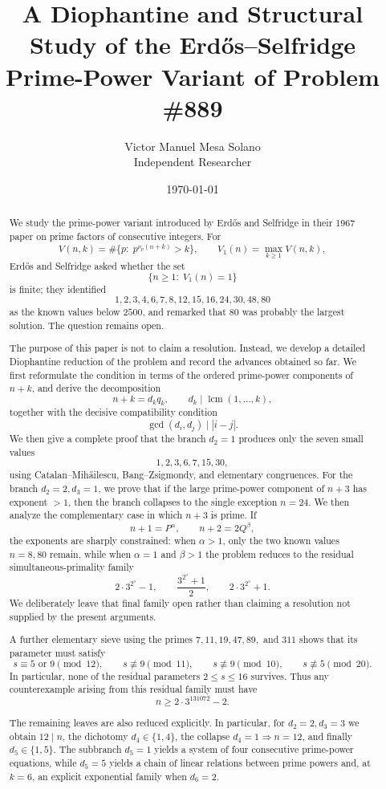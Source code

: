 \documentclass[11pt]{article}
\title{\textbf{A Diophantine and Structural Study of the Erd\H{o}s--Selfridge Prime-Power Variant of Problem \#889}}
\author{Victor Manuel Mesa Solano\\
\small Independent Researcher}
\date{\today}
\begin{document}
\maketitle

\begin{abstract}
We study the prime-power variant introduced by Erd\H{o}s and Selfridge in their
1967 paper on prime factors of consecutive integers.  For
\[
V(n,k)=\#\{p:\;p^{\nu_p(n+k)}>k\},
\qquad
V_1(n)=\max_{k\geq 1}V(n,k),
\]
Erd\H{o}s and Selfridge asked whether the set
\[
\{n\geq 1:\;V_1(n)=1\}
\]
is finite; they identified
\[
1,2,3,4,6,7,8,12,15,16,24,30,48,80
\]
as the known values below \(2500\), and remarked that \(80\) was probably the
largest solution.  The question remains open.

The purpose of this paper is not to claim a resolution.  Instead, we develop
a detailed Diophantine reduction of the problem and record the advances obtained
so far.  We first reformulate the condition in terms of the ordered
prime-power components of \(n+k\), and derive the decomposition
\[
n+k=d_kq_k,\qquad d_k\mid \operatorname{lcm}(1,\ldots,k),
\]
together with the decisive compatibility condition
\[
\gcd(d_i,d_j)\mid |i-j|.
\]
We then give a complete proof that the branch \(d_2=1\) produces only
the seven small values
\[
1,2,3,6,7,15,30,
\]
using Catalan--Mih\H ailescu, Bang--Zsigmondy, and elementary congruences.
For the branch \(d_2=2,d_3=1\), we prove that if the large prime-power component
of \(n+3\) has exponent \(>1\), then the branch collapses to the single
exception \(n=24\).  We then analyze the complementary case in which \(n+3\)
is prime.  If
\[
n+1=P^\alpha,
\qquad
n+2=2Q^\beta,
\]
the exponents are sharply constrained: when \(\alpha>1\), only the two
known values \(n=8,80\) remain, while when \(\alpha=1\) and \(\beta>1\) the
problem reduces to the residual simultaneous-primality family
\[
2\cdot3^{2^s}-1,\qquad
\frac{3^{2^s}+1}{2},\qquad
2\cdot3^{2^s}+1.
\]
We deliberately leave that final family open rather than claiming a
resolution not supplied by the present arguments.

A further elementary sieve using the primes \(7,11,19,47,89,\) and \(311\)
shows that its parameter must satisfy
\[
s\equiv5\text{ or }9\pmod{12},\qquad
s\not\equiv9\pmod{11},\qquad
s\not\equiv9\pmod{10},\qquad
s\not\equiv5\pmod{20}.
\]
In particular, none of the residual parameters \(2\leq s\leq16\) survives.
Thus any counterexample arising from this residual family must have
\[
n\geq2\cdot3^{131072}-2.
\]

The remaining leaves are also reduced explicitly.  In particular, for
\(d_2=2,d_3=3\) we obtain \(12\mid n\), the dichotomy
\(d_4\in\{1,4\}\), the collapse \(d_4=1\Rightarrow n=12\), and finally
\(d_5\in\{1,5\}\).  The subbranch \(d_5=1\) yields a system of four
consecutive prime-power equations, while \(d_5=5\) yields a chain of
linear relations between prime powers and, at \(k=6\), an explicit exponential
family when \(d_6=2\).


\end{abstract}
\end{document}
